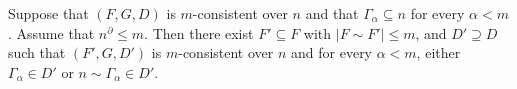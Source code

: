 Suppose that $(F, G, D)$ is $m$-consistent over $n$ and that $\Gamma_\alpha \subseteq n$ for every $\alpha < m$. Assume that $n^\partial \leq m$. Then there exist $F' \subseteq F$ with $|F \sim F'| \leq m$, and $D' \supseteq D$ such that $(F', G, D')$ is $m$-consistent over $n$ and for every $\alpha < m$, either $\Gamma_\alpha \in D'$ or $n \sim \Gamma_\alpha \in D'$.
